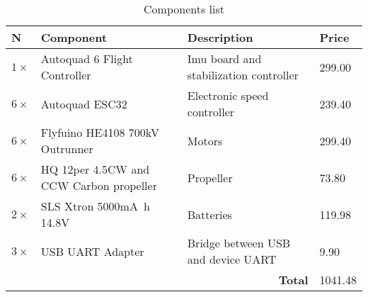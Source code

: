 \begin{table}
	\begin{center}
		\begin{tabular}{ p{0.3cm} p{3.7cm} p{3.7cm} p{1cm} }
			\hline \scriptsize{\textbf{N}} & \footnotesize{\textbf{Component}} & \scriptsize{\textbf{Description}} & \footnotesize{\textbf{Price}} \\ \hline
			\scriptsize{$1\times$} & \footnotesize{Autoquad 6 Flight Controller} & \scriptsize{Imu board and stabilization controller} & \footnotesize{299.00\texteuro} \\
			\scriptsize{$6\times$} & \footnotesize{Autoquad ESC32} & \scriptsize{Electronic speed controller} & \footnotesize{239.40\texteuro} \\
			\scriptsize{$6\times$} & \footnotesize{Flyfuino HE4108 700kV Outrunner} & \scriptsize{Motors} & \footnotesize{299.40\texteuro} \\
			\scriptsize{$6\times$} & \footnotesize{HQ 12\inch per 4.5\inch CW and CCW Carbon propeller} & \scriptsize{Propeller} & \footnotesize{73.80\texteuro} \\
			\scriptsize{$2\times$} & \footnotesize{SLS Xtron \num{5000}\si{\milli\ampere\hour} \num{14.8}\si{\volt}} & \footnotesize{Batteries} & \footnotesize{119.98\texteuro} \\
			\scriptsize{$3\times$} & \footnotesize{USB UART Adapter} & \scriptsize{Bridge between USB and device UART} & \footnotesize{9.90\texteuro} \\
			\hline
			\multicolumn{3}{r}{\footnotesize{\textbf{Total}}}  & \footnotesize{1041.48\texteuro} \\
			\hline
		\end{tabular}
	\end{center}
	\caption{Components list \label{tbl:components_list}}
\end{table}